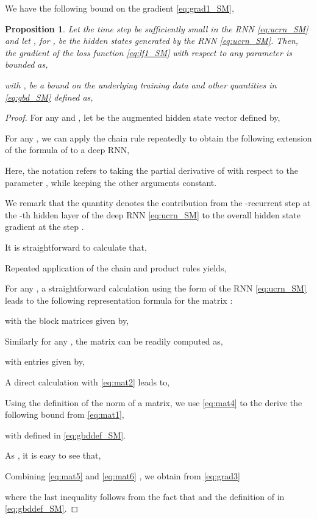 \documentclass{article}
\newtheorem{proposition}[theorem]{Proposition}
\begin{document}
We have the following bound on the gradient \eqref{eq:grad1_SM},
\begin{proposition}
\label{prop:3_SM}
Let the time step  be sufficiently small in the RNN \eqref{eq:ucrn_SM} and let , for , be the hidden states generated by the RNN \eqref{eq:ucrn_SM}. Then, the gradient of the loss function  \eqref{eq:lf1_SM} with respect to any parameter  is bounded as,

with , be a bound on the underlying training data and other quantities in \eqref{eq:gbd_SM} defined as,

\end{proposition}
\begin{proof}
For any  and , let  be the augmented hidden state vector defined by,

For any , we can apply the chain rule repeatedly to obtain the following extension of the formula of \cite{vanish_grad} to a deep RNN,

Here, the notation  refers to taking the partial derivative of  with respect to the parameter , while keeping the other arguments constant. 

We remark that the quantity  denotes the contribution from the -recurrent step at the -th hidden layer of the deep RNN \eqref{eq:ucrn_SM} to the overall hidden state gradient at the step . 

It is straightforward to calculate that,


Repeated application of the chain and product rules yields,

For any , a straightforward calculation using the form of the RNN \eqref{eq:ucrn_SM} leads to the following representation formula for the matrix :

with the block matrices  given by,

Similarly for any , the matrix   can be readily computed as,

with entries given by,

A direct calculation with \eqref{eq:mat2} leads to,

Using the definition of the  norm of a matrix, we use \eqref{eq:mat4} to the derive the following bound from \eqref{eq:mat1},

with  defined in \eqref{eq:gbddef_SM}.


As , it is easy to see that,

Combining \eqref{eq:mat5} and \eqref{eq:mat6} , we obtain from \eqref{eq:grad3}

where the last inequality follows from the fact that  and the definition of  in \eqref{eq:gbddef_SM}.


\end{proof}
\end{document}

